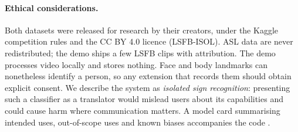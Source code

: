 \paragraph{Ethical considerations.}
Both datasets were released for research by their creators, under the Kaggle competition rules and
the CC BY 4.0 licence (LSFB-ISOL). ASL data are never redistributed; the demo ships a few LSFB clips
with attribution. The demo processes video locally and stores nothing. Face and body landmarks can
nonetheless identify a person, so any extension that records them should obtain explicit consent.
We describe the system as \emph{isolated sign recognition}: presenting such a classifier as a
translator would mislead users about its capabilities and could cause harm where communication
matters. A model card summarising intended uses, out-of-scope uses and known biases accompanies
the code \citep{mitchell2019modelcards}.
